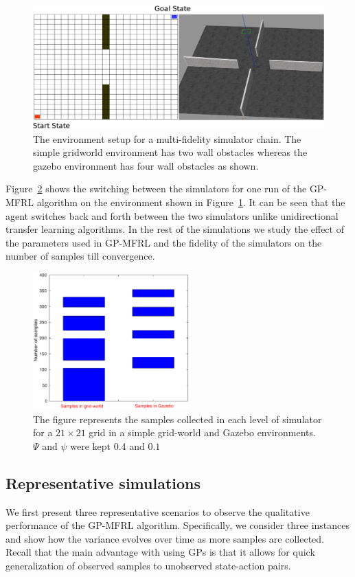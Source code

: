 \documentclass[12pt]{report}
\begin{document}
\begin{figure}[htp]
	\centering
	\includegraphics[width=1\columnwidth]{env.eps}
	\caption{The environment setup for a multi-fidelity simulator chain. The simple gridworld environment has two wall obstacles whereas the gazebo environment has four wall obstacles as shown.}
   \label{fig:gp_mfrl_setup}
\end{figure}

Figure~\ref{fig:epoch_samples} shows the switching between the simulators for one run of the GP-MFRL algorithm on the environment shown in Figure~\ref{fig:gp_mfrl_setup}. It can be seen that the agent switches back and forth between the two simulators unlike unidirectional transfer learning algorithms. In the rest of the simulations we study the effect of the parameters used in GP-MFRL and the fidelity of the simulators on the number of samples till convergence.
\begin{figure}[htp]
	\centering 
    \includegraphics[width=6cm]{epoch.eps}
	\caption{ The figure represents the samples collected in each level of simulator for a $21 \times 21$ grid in a simple grid-world and Gazebo environments. $\Psi$ and $\psi$ were kept 0.4 and $0.1$}
   \label{fig:epoch_samples}
\end{figure}

\subsection{Representative simulations}
We first present three representative scenarios to observe the qualitative performance of the GP-MFRL algorithm. Specifically, we consider three instances and show how the variance evolves over time as more samples are collected. Recall that the main advantage with using GPs is that it allows for quick generalization of observed samples to unobserved state-action pairs.
\end{document}
